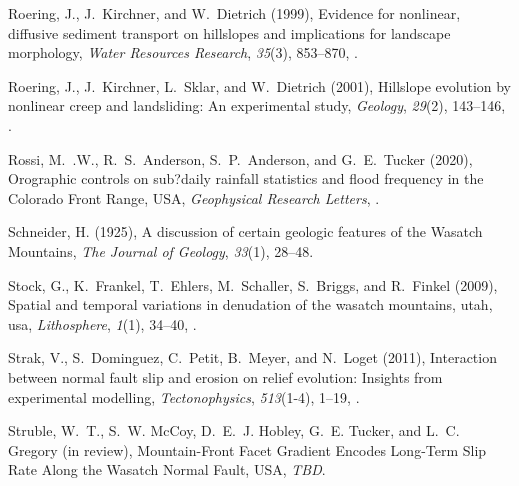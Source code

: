 \begin{thebibliography}{41}
Roering, J., J.~Kirchner, and W.~Dietrich ({1999}), {Evidence for nonlinear,
  diffusive sediment transport on hillslopes and implications for landscape
  morphology}, \textit{{Water Resources Research}}, \textit{{35}}({3}),
  {853--870}, .

Roering, J., J.~Kirchner, L.~Sklar, and W.~Dietrich ({2001}), {Hillslope
  evolution by nonlinear creep and landsliding: An experimental study},
  \textit{{Geology}}, \textit{{29}}({2}), {143--146},
  .

Rossi, M.~.W., R.~S.~Anderson, S.~P.~Anderson, and G.~E.~Tucker (2020), Orographic controls on sub?daily rainfall statistics and flood frequency in the Colorado Front Range, USA, \textit{Geophysical Research Letters},
  .

Schneider, H. (1925), {A discussion of certain geologic features of the Wasatch
  Mountains}, \textit{The Journal of Geology}, \textit{33}(1), 28--48.

Stock, G., K.~Frankel, T.~Ehlers, M.~Schaller, S.~Briggs, and R.~Finkel (2009),
  Spatial and temporal variations in denudation of the wasatch mountains, utah,
  usa, \textit{Lithosphere}, \textit{1}(1), 34--40, .

Strak, V., S.~Dominguez, C.~Petit, B.~Meyer, and N.~Loget (2011), Interaction
  between normal fault slip and erosion on relief evolution: Insights from
  experimental modelling, \textit{Tectonophysics}, \textit{513}(1-4), 1--19,
  .

Struble, W.~T., S.~W. McCoy, D.~E.~J. Hobley, G.~E. Tucker, and L.~C. Gregory
  (in review), {Mountain-Front Facet Gradient Encodes Long-Term Slip Rate Along
  the Wasatch Normal Fault, USA}, \textit{TBD}.


\end{thebibliography}
